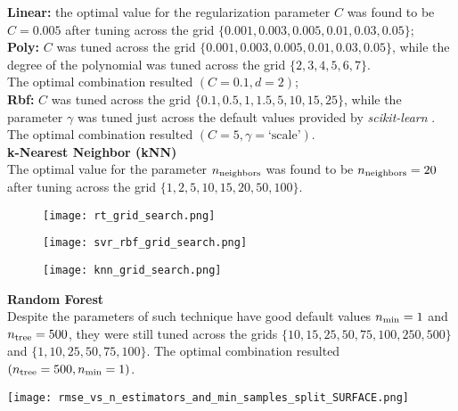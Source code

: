 \documentclass{article}
\newcommand{\nmin}{n_{\rm min}}
\newcommand{\ntree}{n_{\rm tree}}
\begin{document}
\textbf{Linear:} the optimal value for the regularization parameter $C$ was found to be $C=0.005$ after tuning across the grid $\{0.001,0.003,0.005,0.01,0.03,0.05\}$;\\[0.15cm]
\textbf{Poly:} $C$ was tuned across the grid $\{0.001,0.003,0.005,0.01,0.03,0.05\}$, while the degree of the polynomial was tuned across the grid $\{2, 3, 4, 5, 6, 7\}$.\\
The optimal combination resulted $(C=0.1,d=2)$;\\[0.15cm]
\textbf{Rbf:} $C$ was tuned across the grid $\{0.1,0.5,1,1.5,5,10,15,25\}$, while the parameter $\gamma$ was tuned just across the default values provided by \textit{scikit-learn} \cite{scikit-learn}.\\The optimal combination resulted $(C=5,\gamma=\text{`scale'})$.\\[0.2cm]
\noindent
\textbf{k-Nearest Neighbor (kNN)} \\[0.1cm]
The optimal value for the parameter $n_{\rm neighbors}$ was found to be $n_{\rm neighbors}=20$ after tuning across the grid $\{1, 2, 5, 10, 15, 20, 50, 100\}$.
\begin{figure}[H]
  \begin{minipage}{0.33\textwidth}
    \centering
    \texttt{[image: rt\_grid\_search.png]}
    \label{fig:img1}
  \end{minipage}
  \begin{minipage}{0.33\textwidth}
    \centering
    \texttt{[image: svr\_rbf\_grid\_search.png]}
    \label{fig:img3}
  \end{minipage}
  \begin{minipage}{0.32\textwidth}
    \centering
    \texttt{[image: knn\_grid\_search.png]}
    \label{fig:img4}
  \end{minipage}
\end{figure}
\noindent
\begin{minipage}{0.55\textwidth}
    \textbf{Random Forest} \\
    Despite the parameters of such technique have good default values $\nmin=1$ and $\ntree=500$, they were still tuned across the grids $\{10, 15, 25, 50, 75, 100, 250, 500\}$ and $\{1, 10, 25, 50, 75, 100\}$. The optimal combination resulted $(\ntree = 500,\nmin = 1)$.
\end{minipage}
\begin{minipage}{0.45\textwidth}
    \centering
    \texttt{[image: rmse\_vs\_n\_estimators\_and\_min\_samples\_split\_SURFACE.png]}
\end{minipage}
\end{document}
